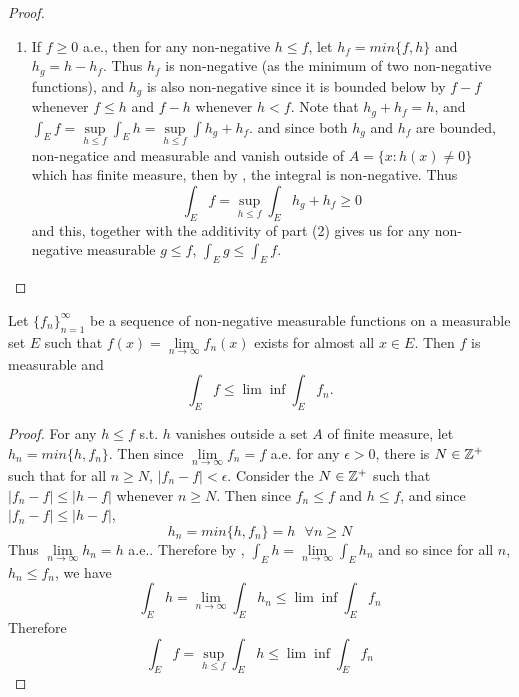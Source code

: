 \begin{pblm}
\begin{proof}
\begin{enumerate}
	\item If $f \ge 0$ a.e., then for any non-negative $h \le f$, let $h_f = min\{f, h\}$ and $h_g = h - h_f$. 
		Thus $h_f$ is non-negative (as the minimum of two non-negative functions), and $h_g$ is also non-negative since 
		it is bounded below by  $f - f$ whenever $f \le h$ and $f - h$ whenever $h < f$. 
		Note that $h_g + h_f = h$, and $\int_E f = \sup\limits_{h\le f}\int_E h = \sup\limits_{h\le f}\int h_g+h_f$. 
		and since both $h_g$ and $h_f$ are bounded, non-negatice and measurable and vanish outside of 
		$A = \{x: h(x) \neq 0\}$ which has finite measure, then by , the integral 
		is non-negative. Thus 
		\begin{equation*}
			\int_Ef = \sup\limits_{h\le f}\int_Eh_g+h_f \ge 0
		\end{equation*}
		and this, together with the additivity of part (2) gives us for any non-negative measurable $g \le f$, 
		$\int_E g \le \int_E f$. 
\end{enumerate}
\end{proof}
\end{pblm}

\pagebreak
\begin{pblm}\label{p:fatou}%
	Let $\{f_n\}_{n=1}^\infty$ be a sequence of non-negative measurable functions on a 
	measurable set $E$ such that $f(x) = \lim\limits_{n\to\infty}f_n(x)$ exists for almost 
	all $x \in E$. Then $f$ is measurable and 
	\begin{equation*}
		\int_E f \le \lim\inf\int_E f_n.
	\end{equation*}
\begin{proof}
	For any $h \le f$ s.t. $h$ vanishes outside a set $A$ of finite measure, 
	let $h_n = min\{h, f_n\}$. %
	Then since $\lim\limits_{n\to\infty} f_n = f$ a.e.  
	for any $\epsilon > 0$, there is $N \in \mathbb{Z}^+$ such that for all $n \ge N$, 
	$|f_n - f| < \epsilon$. Consider the $N \in \mathbb{Z}^+$ such that 
	$|f_n - f| \le |h - f|$ whenever $n \ge N$. Then 
	since $f_n \le f$ and $h \le f$, and since $|f_n - f| \le |h - f|$, 
	\begin{equation*}
		h_n = min\{h, f_n\} = h  ~~~ \forall n \ge N
	\end{equation*}
	Thus $\lim\limits_{n\to\infty}h_n = h$ a.e.. Therefore by , 
	$ \int_E h = \lim\limits_{n\to\infty}\int_E h_n $ 
	and so since for all $n$, $h_n \le f_n$, we have 
	\begin{equation*}
		\int_E h = \lim\limits_{n\to\infty}\int_E h_n \le \lim\inf\int_E f_n
	\end{equation*}
	Therefore 
	\begin{equation*}
		\int_E f = \sup\limits_{h\le f}\int_E h \le \lim\inf\int_E f_n
	\end{equation*}
\end{proof}
\end{pblm}

